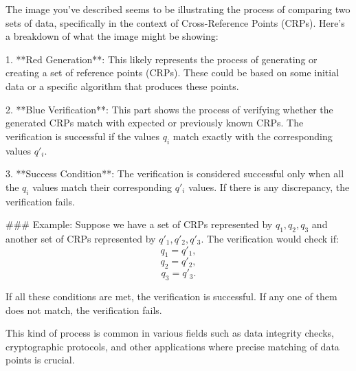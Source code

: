 The image you've described seems to be illustrating the process of comparing two sets of data, specifically in the context of Cross-Reference Points (CRPs). Here's a breakdown of what the image might be showing:

1. **Red Generation**: This likely represents the process of generating or creating a set of reference points (CRPs). These could be based on some initial data or a specific algorithm that produces these points.

2. **Blue Verification**: This part shows the process of verifying whether the generated CRPs match with expected or previously known CRPs. The verification is successful if the values \( q_i \) match exactly with the corresponding values \( q'_i \).

3. **Success Condition**: The verification is considered successful only when all the \( q_i \) values match their corresponding \( q'_i \) values. If there is any discrepancy, the verification fails.

### Example:
Suppose we have a set of CRPs represented by \( q_1, q_2, q_3 \) and another set of CRPs represented by \( q'_1, q'_2, q'_3 \). The verification would check if:
\[ q_1 = q'_1, \]
\[ q_2 = q'_2, \]
\[ q_3 = q'_3. \]

If all these conditions are met, the verification is successful. If any one of them does not match, the verification fails.

This kind of process is common in various fields such as data integrity checks, cryptographic protocols, and other applications where precise matching of data points is crucial.